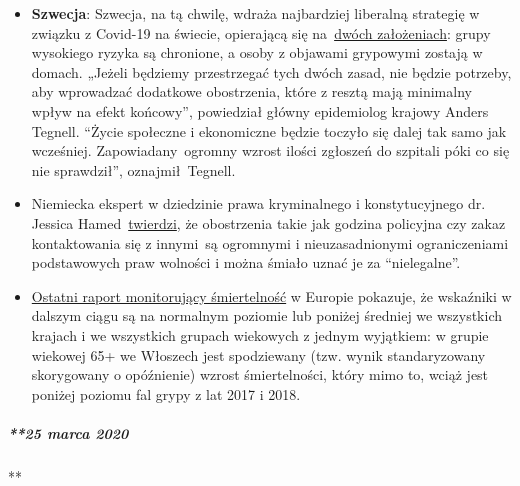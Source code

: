 \begin{itemize}
\tightlist
\item
  \textbf{Szwecja}: Szwecja, na tą chwilę, wdraża najbardziej liberalną
  strategię w związku z Covid-19 na świecie, opierającą się
  na~\href{https://www.zeit.de/politik/ausland/2020-03/coronavirus-schweden-stockholm-oeffentliches-leben/komplettansicht}{dwóch
  założeniach}: grupy wysokiego ryzyka są chronione, a osoby z objawami
  grypowymi zostają w domach. „Jeżeli będziemy przestrzegać tych dwóch
  zasad, nie będzie potrzeby, aby wprowadzać dodatkowe obostrzenia,
  które z resztą mają minimalny wpływ na efekt końcowy'', powiedział
  główny epidemiolog krajowy Anders Tegnell. ``Życie społeczne i
  ekonomiczne będzie toczyło się dalej tak samo jak wcześniej.
  Zapowiadany~ogromny wzrost ilości zgłoszeń do szpitali póki co się nie
  sprawdził'', oznajmił~Tegnell.
\item
  Niemiecka ekspert w dziedzinie prawa kryminalnego i konstytucyjnego
  dr. Jessica
  Hamed~\href{https://www.fr.de/politik/coronakrise-deutschland-sind-kontaktsperren-ausgangsbeschraenkungen-rechtswidrig-13611821.html}{twierdzi},
  że obostrzenia takie jak godzina policyjna czy zakaz kontaktowania się
  z innymi~są ogromnymi i nieuzasadnionymi ograniczeniami podstawowych
  praw wolności i można śmiało uznać je za ``nielegalne''.
\item
  \href{https://www.euromomo.eu/index.html}{Ostatni raport monitorujący
  śmiertelność} w Europie pokazuje, że wskaźniki w dalszym ciągu są na
  normalnym poziomie lub poniżej średniej we wszystkich krajach i we
  wszystkich grupach wiekowych z jednym wyjątkiem: w grupie wiekowej 65+
  we Włoszech jest spodziewany (tzw. wynik standaryzowany skorygowany o
  opóźnienie) wzrost śmiertelności, który mimo to, wciąż jest poniżej
  poziomu fal grypy z lat 2017 i 2018.
\end{itemize}

\hypertarget{25-marca-2020}{%
\subparagraph{**25 marca 2020}\label{25-marca-2020}}

**

